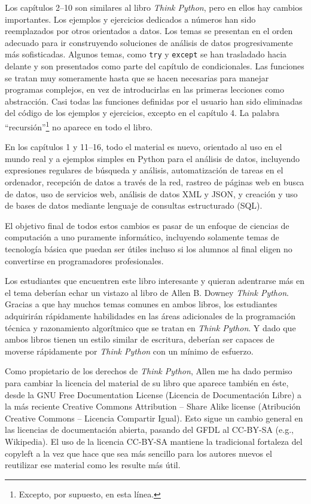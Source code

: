 Los capítulos 2--10 son similares al libro \emph{Think Python},
pero en ellos hay cambios importantes. Los ejemplos y ejercicios
dedicados a números han sido reemplazados por otros orientados a datos.
Los temas se presentan en el orden adecuado para ir construyendo soluciones
de análisis de datos progresivamente más sofisticadas.
Algunos temas, como {\tt try} y {\tt except} se han trasladado hacia delante
y son presentados como parte del capítulo de condicionales.
Las funciones se tratan muy someramente hasta que se hacen necesarias
para manejar programas complejos, en vez de introducirlas en las primeras
lecciones como abstracción. Casi todas las funciones definidas por el usuario
han sido eliminadas del código de los ejemplos y ejercicios, excepto en el capítulo 4.
La palabra ``recursión''\footnote{Excepto, por supuesto, en esta línea.}
no aparece en todo el libro.

En los capítulos 1 y 11--16, todo el material es nuevo, orientado
al uso en el mundo real y a ejemplos simples en Python para el
análisis de datos, incluyendo expresiones regulares de búsqueda y análisis,
automatización de tareas en el ordenador, recepción de datos a través de la red,
rastreo de páginas web en busca de datos,
uso de servicios web, análisis de datos XML y JSON, y creación y uso
de bases de datos mediante lenguaje de consultas estructurado (SQL).

El objetivo final de todos estos cambios es pasar de un enfoque
de ciencias de computación a uno puramente informático, incluyendo
solamente temas de tecnología básica que puedan
ser útiles incluso si los alumnos al final eligen no convertirse en
programadores profesionales.

Los estudiantes que encuentren este libro interesante y quieran adentrarse
más en el tema deberían echar un vistazo al libro de Allen B. Downey
\emph{Think Python}. Gracias a que hay muchos temas comunes en ambos libros,
los estudiantes adquirirán rápidamente habilidades en las áreas adicionales
de la programación técnica y razonamiento algorítmico que se tratan en
\emph{Think Python}.
Y dado que ambos libros tienen un estilo similar de escritura, deberían ser
capaces de moverse rápidamente por \emph{Think Python} con un mínimo de esfuerzo.

Como propietario de los derechos de \emph{Think Python},
Allen me ha dado permiso para cambiar la licencia
del material de su libro que aparece también en éste,
desde la
GNU Free Documentation License (Licencia de Documentación Libre)
a la más reciente
Creative Commons Attribution -- Share Alike license
(Atribución Creative Commons -- Licencia Compartir Igual).
Esto sigue un cambio general en las licencias de documentación abierta,
pasando del GFDL al CC-BY-SA (e.g., Wikipedia).
El uso de la licencia CC-BY-SA mantiene la tradicional fortaleza del copyleft
a la vez que hace que sea más sencillo para los autores nuevos
el reutilizar ese material como les resulte más útil.

